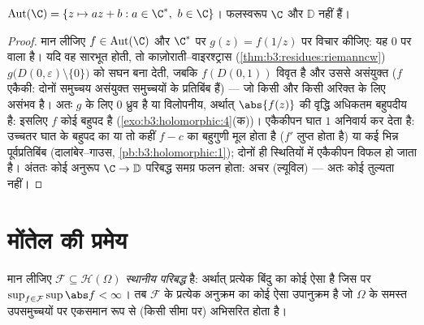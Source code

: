 \begin{theorem}
\label{thm:b3:conformal:autplane}
$\operatorname{Aut}(\C) = \{z \mapsto az + b : a \in \C^*,\ b
\in \C\}$। फलस्वरूप $\C$ और $\mathbb D$  नहीं हैं।
\end{theorem}

\begin{proof}
मान लीजिए $f \in \operatorname{Aut}(\C)$ और $\C^*$ पर $g(z) =
f(1/z)$ पर विचार कीजिए: यह $0$ पर
 वाला  है। यदि वह सारभूत होती, तो
काज़ोराती--वाइरश्ट्रास (\cref{thm:b3:residues:riemanncw}) $g\bigl(D(0,\varepsilon)\setminus\{0\}\bigr)$ को सघन बना देती, जबकि $f(D(0, 1))$
विवृत है और उससे असंयुक्त ($f$ एकैकी: दोनों समुच्चय असंयुक्त
समुच्चयों के प्रतिबिंब हैं) --- जो किसी  और किसी अरिक्त
 के लिए असंभव है। अतः $g$ के लिए $0$ ध्रुव है या
विलोपनीय, अर्थात् $\abs{f(z)}$ की वृद्धि अधिकतम बहुपदीय है: इसलिए $f$
कोई बहुपद है (\cref{exo:b3:holomorphic:4}(क))। एकैकीपन घात $1$ अनिवार्य कर देता है:
उच्चतर घात के बहुपद का या तो कहीं $f - c$ का बहुगुणी मूल होता है
($f'$ लुप्त होता है) या कई भिन्न पूर्वप्रतिबिंब (दालांबेर--गाउस,
\cref{pb:b3:holomorphic:1}); दोनों ही स्थितियों में एकैकीपन विफल हो जाता है। अंततः कोई
अनुरूप $\C \to
\mathbb D$ परिबद्ध समग्र फलन होता: अचर (ल्यूविल) --- अतः कोई
तुल्यता नहीं।
\end{proof}

\section{मोंतेल की प्रमेय}

\begin{theorem}[मोंतेल]\label{thm:b3:conformal:montel}
मान लीजिए $\mathcal F \subseteq \mathcal H(\Omega)$ \emph{स्थानीय परिबद्ध} है: अर्थात् प्रत्येक बिंदु
का कोई ऐसा  है जिस पर $\sup_{f\in
\mathcal F}\sup\abs f < \infty$। तब $\mathcal F$ के प्रत्येक अनुक्रम
का कोई ऐसा उपानुक्रम है जो $\Omega$ के समस्त  उपसमुच्चयों पर
एकसमान रूप से (किसी  सीमा पर) अभिसरित होता
है।
\end{theorem}

